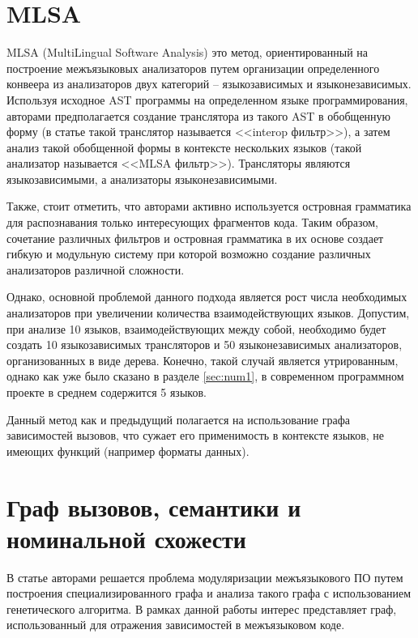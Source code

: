 \section{MLSA} \label{ssec:mlsa}

MLSA (MultiLingual Software Analysis) \cite{MLSA} это метод, ориентированный на построение межъязыковых анализаторов
путем организации определенного конвеера из анализаторов двух категорий -- языкозависимых и языконезависимых.
Используя исходное AST программы на определенном языке программирования, авторами предполагается
создание транслятора из такого AST в обобщенную форму (в статье такой транслятор называется <<interop фильтр>>),
а затем анализ такой обобщенной формы в контексте нескольких языков (такой анализатор называется <<MLSA фильтр>>).
Трансляторы являются языкозависимыми, а анализаторы языконезависимыми.

Также, стоит отметить, что авторами активно используется островная грамматика \cite{island-grammars} для
распознавания только интересующих фрагментов кода. Таким образом, сочетание различных фильтров и островная грамматика
в их основе создает гибкую и модульную систему при которой возможно создание различных анализаторов различной сложности.

Однако, основной проблемой данного подхода является рост числа необходимых анализаторов при увеличении
количества взаимодействующих языков. Допустим, при анализе 10 языков, взаимодействующих между собой, необходимо
будет создать 10 языкозависимых трансляторов и 50 языконезависимых анализаторов, организованных в виде
дерева. Конечно, такой случай является утрированным, однако как уже было сказано в разделе \ref{sec:num1}, в современном
программном проекте в среднем содержится 5 языков.

Данный метод как и предыдущий полагается на использование графа зависимостей вызовов, что сужает его применимость
в контексте языков, не имеющих функций (например форматы данных).

\section{Граф вызовов, семантики и номинальной схожести} \label{ssec:graphs}

В статье \cite{SNDGA} авторами решается проблема модуляризации межъязыкового ПО путем построения специализированного графа
и анализа такого графа с использованием генетического алгоритма. В рамках данной работы интерес представляет
граф, использованный для отражения зависимостей в межъязыковом коде.

